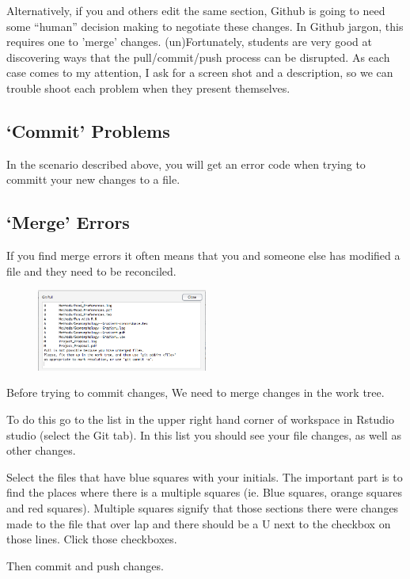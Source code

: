 \documentclass[12pt]{../SOP4_alpha}\usepackage[]{graphicx}\usepackage[]{color}
\begin{document}
\NP Alternatively, if you and others edit the same section, Github is going to need some ``human'' decision making to negotiate these changes. In Github jargon, this requires one to 'merge' changes. 
\NP (un)Fortunately, students are very good at discovering ways that the pull/commit/push process can be disrupted. As each case comes to my attention, I ask for a screen shot and a description, so we can trouble shoot each problem when they present themselves.

\subsection{`Commit' Problems}
\NP In the scenario described above, you will get an error code when trying to committ your new changes to a file. 

\subsection{`Merge' Errors}

\NP If you find merge errors it often means that you and someone else has modified a file and they need to be reconciled.

\begin{figure}
\centering
\includegraphics[width=0.5\textwidth]{graphics/UnmergedError.jpg}
\end{figure}

\NP Before trying to commit changes, We need to merge changes in the work tree. 

\NP To do this go to the list in the upper right hand corner of workspace in Rstudio studio (select the Git tab). In this list you should see your file changes, as well as other changes. 

\NP Select the files that have blue squares with your initials. The important part is to find the places where there is a multiple squares (ie. Blue squares, orange squares and red squares). Multiple squares signify that those sections there were changes made to the file that over lap and there should be a U next to the checkbox on those lines. Click those checkboxes. 

\NP Then commit and push changes. 
\end{document}
